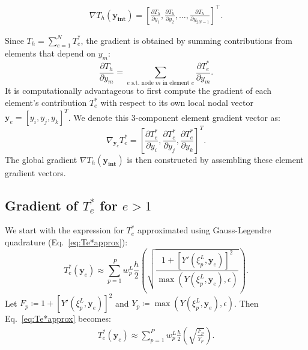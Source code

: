 \documentclass[11pt]{article}
\begin{document}
\begin{align} 
    \nabla T_h(\mathbf{y_\text{int}}) = \left[ \frac{\partial T_h}{\partial y_1}, \frac{\partial T_h}{\partial y_2}, \ldots, \frac{\partial T_h}{\partial y_{2N-1}} \right]^\top. \label{eq:gradT} 
\end{align}

Since \( T_h = \sum_{e=1}^{N} T_e^* \), the gradient is obtained by summing contributions from elements that depend on \( y_m \):
\[ 
    \frac{\partial T_h}{\partial y_m} = \sum_{e \text{ s.t. node } m \text{ in element } e} \frac{\partial T_e^*}{\partial y_m}.
\]
It is computationally advantageous to first compute the gradient of each element's contribution \( T_e^* \) with respect to its own local nodal vector \( \mathbf{y}_e = [y_i, y_j, y_k]^T \). We denote this 3-component element gradient vector as:
\[ 
    \nabla_{\mathbf{y}_e} T_e^* = \left[ \frac{\partial T_e^*}{\partial y_i}, \frac{\partial T_e^*}{\partial y_j}, \frac{\partial T_e^*}{\partial y_k} \right]^T. 
\]
The global gradient \( \nabla T_h(\mathbf{y_\text{int}}) \) is then constructed by assembling these element gradient vectors.

\subsection{Gradient of $ T^{*}_e  $ for $ e > 1 $}
We start with the expression for \( T_e^* \) approximated using Gauss-Legendre quadrature (Eq.~\eqref{eq:Te*approx}):
\[ 
    T_e^*(\mathbf{y}_e) \approx \sum_{p=1}^{P} w_{p}^{L} \frac{h}{2} \left( \sqrt{\frac{1 + [Y'(\xi_{p}^{L}, \mathbf{y}_e)]^2}{ \max(Y(\xi_{p}^{L}, \mathbf{y}_e), \epsilon) }} \right) .
\]
Let \( F_p \coloneqq 1 + [Y'(\xi_p^L, \mathbf{y}_e)]^2 \) and \( Y_p \coloneqq \max(Y(\xi_p^L, \mathbf{y}_e), \epsilon) \). Then Eq.~\eqref{eq:Te*approx} becomes:  
\begin{align} 
    T_e^*(\mathbf{y}_e) \approx \sum_{p=1}^{P} w_{p}^{L} \frac{h}{2} \left( \sqrt{\frac{F_p}{Y_p}} \right) . \label{eq:Te*approx2}
\end{align}
\end{document}
